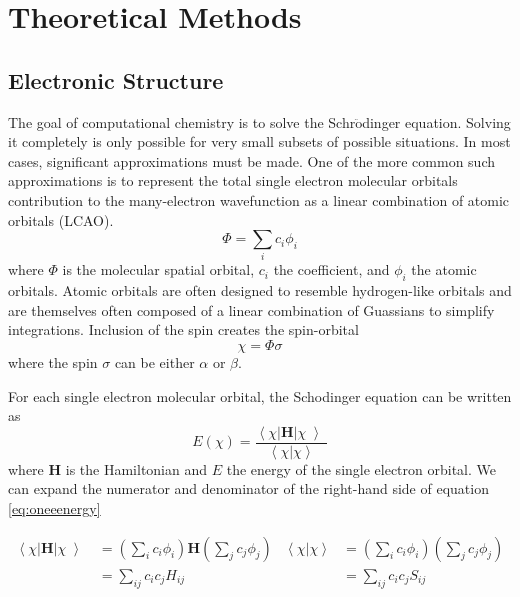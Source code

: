 \chapter{Theoretical Methods} \label{theoreticalMethods}

\section{Electronic Structure}\label{secular}

The goal of computational chemistry is to solve the Schr\(\ddot{\text{o}}\)dinger equation.
Solving it completely is only possible for very small subsets of possible situations.
In most cases, significant approximations must be made.
One of the more common such approximations is to represent the total single electron molecular orbitals contribution to the many-electron wavefunction as a linear combination of atomic orbitals (LCAO).
\begin{equation}
  \Phi=\sum_{i}c_i\phi_i
\end{equation}
where \(\Phi\) is the molecular spatial orbital, \(c_i\) the coefficient, and \(\phi_i\) the atomic orbitals.
Atomic orbitals are often designed to resemble hydrogen-like orbitals and are themselves often composed of a linear combination of Guassians to simplify integrations.
Inclusion of the spin creates the spin-orbital
\begin{equation}
  \chi = \Phi \sigma
\end{equation}
where the spin \(\sigma\) can be either \(\alpha\) or \(\beta\).

For each single electron molecular orbital, the Schodinger equation can be written as
\begin{equation} \label{eq:oneeenergy}
  E(\chi) = \frac{\left<\right.\chi\left|\right.\bm{H}\left.\right|\chi\left>\right.}{\left<\right.\chi\left.\right|\left.\chi\left.\right.\right>}
\end{equation}
where $\mathbf{H}$ is the Hamiltonian and $E$ the energy of the single electron orbital.
We can expand the numerator and denominator of the right-hand side of equation \ref{eq:oneeenergy}

\begin{align}
  \label{eq:variation1}
  \left<\right.\chi\left|\right.\bm{H}\left.\right|\chi\left>\right.&=
  \left( \sum_{i} c_i \phi_i \right) \mathbf{H} \left( \sum_j c_j \phi_j \right) &
  \left<\right.\chi\left.\right|\left.\chi\left.\right.\right>&=
  \left( \sum_{i} c_i \phi_i \right) \left( \sum_j c_j \phi_j \right)  \\
  &= \sum_{ij} c_{i}c_j H_{ij} & &= \sum_{ij} c_{i}c_j S_{ij} 
  \label{eq:variation2}
\end{align}

